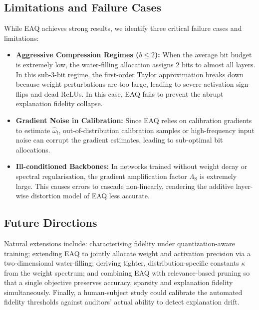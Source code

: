 \subsection{Limitations and Failure Cases}
\label{sec:failures}
While EAQ achieves strong results, we identify three critical failure cases and limitations:
\begin{itemize}
\item \textbf{Aggressive Compression Regimes ($b \le 2$):} When the average bit budget is extremely low, the water-filling allocation assigns $2$ bits to almost all layers. In this sub-3-bit regime, the first-order Taylor approximation breaks down because weight perturbations are too large, leading to severe activation sign-flips and dead ReLUs. In this case, EAQ fails to prevent the abrupt explanation fidelity collapse.
\item \textbf{Gradient Noise in Calibration:} Since EAQ relies on calibration gradients to estimate $\hat{\omega}_l$, out-of-distribution calibration samples or high-frequency input noise can corrupt the gradient estimates, leading to sub-optimal bit allocations.
\item \textbf{Ill-conditioned Backbones:} In networks trained without weight decay or spectral regularisation, the gradient amplification factor $\Lambda_{\mathrm{S}}$ is extremely large. This causes errors to cascade non-linearly, rendering the additive layer-wise distortion model of EAQ less accurate.
\end{itemize}

\subsection{Future Directions}
Natural extensions include: characterising fidelity under
quantization-aware training; extending EAQ to jointly allocate weight and
activation precision via a two-dimensional water-filling; deriving tighter,
distribution-specific constants $\kappa$ from the weight spectrum; and combining
EAQ with relevance-based pruning so that a single objective preserves accuracy,
sparsity and explanation fidelity simultaneously. Finally, a human-subject study
could calibrate the automated fidelity thresholds against auditors' actual
ability to detect explanation drift.

